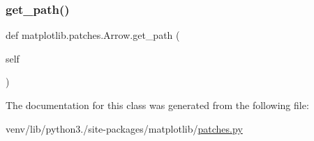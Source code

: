 \mbox{\label{classmatplotlib_1_1patches_1_1Arrow_a48a0d6100c44ee1f1217ad7c5bddb0a9}} 
\subsubsection{\texorpdfstring{get\+\_\+path()}{get\_path()}}
{\footnotesize\ttfamily def matplotlib.\+patches.\+Arrow.\+get\+\_\+path (\begin{DoxyParamCaption}\item[{}]{self }\end{DoxyParamCaption})}



The documentation for this class was generated from the following file\+:\begin{DoxyCompactItemize}
\item 
venv/lib/python3./site-\/packages/matplotlib/\hyperlink{patches_8py}{patches.\+py}\end{DoxyCompactItemize}

